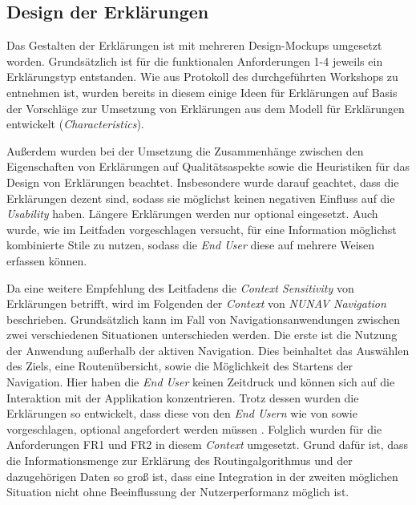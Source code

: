 \subsection{Design der Erklärungen}
\label{sec:explanation_design}

Das Gestalten der Erklärungen ist mit mehreren Design-Mockups umgesetzt worden. Grundsätzlich ist für die funktionalen Anforderungen 1-4 jeweils ein Erklärungstyp entstanden. Wie aus Protokoll des durchgeführten Workshops zu entnehmen ist, wurden bereits in diesem einige Ideen für Erklärungen auf Basis der Vorschläge zur Umsetzung von Erklärungen aus dem Modell für Erklärungen entwickelt (\textit{Characteristics}).

Außerdem wurden bei der Umsetzung die Zusammenhänge zwischen den Eigenschaften von Erklärungen auf Qualitätsaspekte sowie die Heuristiken für das Design von Erklärungen beachtet. Insbesondere wurde darauf geachtet, dass die Erklärungen dezent sind, sodass sie möglichst keinen negativen Einfluss auf die \textit{Usability} haben. Längere Erklärungen werden nur optional eingesetzt. Auch wurde, wie im Leitfaden vorgeschlagen versucht, für eine Information möglichst kombinierte Stile zu nutzen, sodass die \textit{End User} diese auf mehrere Weisen erfassen können.

Da eine weitere Empfehlung des Leitfadens die \textit{Context Sensitivity} von Erklärungen betrifft, wird im Folgenden der \textit{Context} von \textit{NUNAV Navigation} beschrieben.
Grundsätzlich kann im Fall von Navigationsanwendungen zwischen zwei verschiedenen Situationen unterschieden werden. Die erste ist die Nutzung der Anwendung außerhalb der aktiven Navigation. Dies beinhaltet das Auswählen des Ziels, eine Routenübersicht, sowie die Möglichkeit des Startens der Navigation. Hier haben die \textit{End User} keinen Zeitdruck und können sich auf die Interaktion mit der Applikation konzentrieren. Trotz dessen wurden die Erklärungen so entwickelt, dass diese von den \textit{End Usern} wie von \citeauthor{chazette_end-users_nodate} sowie \citeauthor{wang_integration_2020} vorgeschlagen, optional angefordert werden müssen \cite{chazette_end-users_nodate,wang_integration_2020}. Folglich wurden für die Anforderungen FR1 und FR2 in diesem \textit{Context} umgesetzt. Grund dafür ist, dass die Informationsmenge zur Erklärung des Routingalgorithmus und der dazugehörigen Daten so groß ist, dass eine Integration in der zweiten möglichen Situation nicht ohne Beeinflussung der Nutzerperformanz möglich ist.

